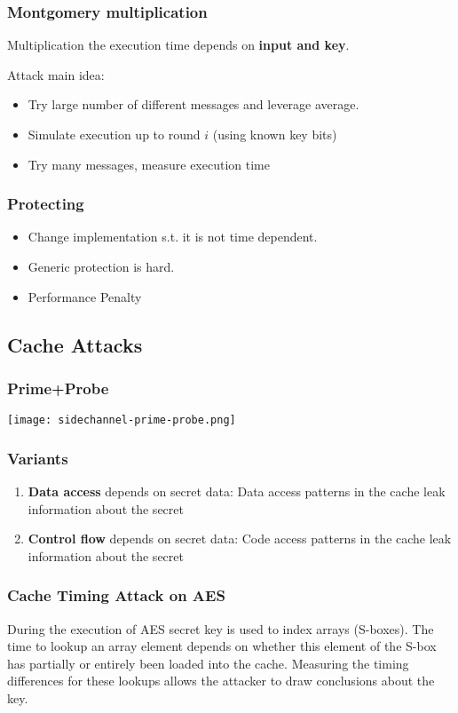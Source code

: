 \subsubsection{Montgomery multiplication}
Multiplication the execution time depends on \textbf{input and key}.

Attack main idea:
\begin{itemize}
  \item Try large number of different messages and leverage average.
  \item Simulate execution up to round $i$ (using known key bits)
  \item Try many messages, measure execution time
\end{itemize}

\subsubsection{Protecting}
\begin{itemize}
  \item Change implementation s.t. it is not time dependent.
  \item Generic protection is hard.
  \item Performance Penalty
\end{itemize}


\subsection{Cache Attacks}
\subsubsection{Prime+Probe}
\texttt{[image: sidechannel-prime-probe.png]}
\subsubsection{Variants}
\begin{enumerate}
  \item \textbf{Data access} depends on secret data: Data access patterns
    in the cache leak information about the secret
  \item \textbf{Control flow} depends on secret data: Code access
    patterns in the cache leak information about the secret
\end{enumerate}
\subsubsection{Cache Timing Attack on AES}
During the execution of AES secret key is used to
index arrays (S-boxes). The time to lookup an array element depends
on whether this element of the S-box has partially or entirely been loaded into the
cache. Measuring the timing differences for these lookups allows the attacker to draw
conclusions about the key.

